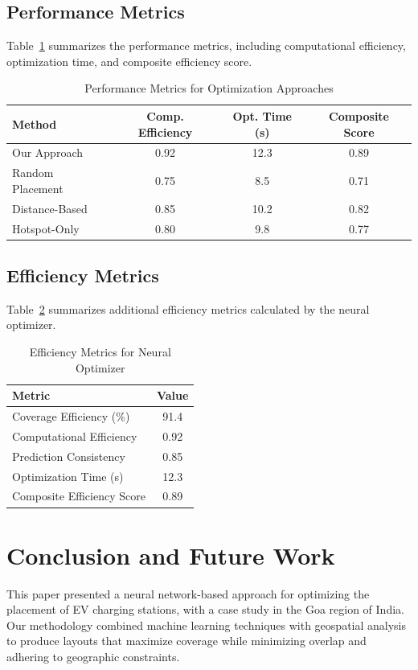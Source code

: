 \documentclass[journal]{IEEEtran}
\begin{document}
\subsection{Performance Metrics}
Table~\ref{tab:performance_metrics} summarizes the performance metrics, including computational efficiency, optimization time, and composite efficiency score.

\begin{table}[htbp]
\centering
\small
\caption{Performance Metrics for Optimization Approaches}
\label{tab:performance_metrics}
\setlength{\tabcolsep}{6pt}
\begin{tabular}{lccc}
\toprule
\textbf{Method} & \textbf{Comp. Efficiency} & \textbf{Opt. Time (s)} & \textbf{Composite Score} \\ 
\midrule
Our Approach      & 0.92 & 12.3 & 0.89 \\ 
Random Placement  & 0.75 & 8.5  & 0.71 \\ 
Distance-Based    & 0.85 & 10.2 & 0.82 \\ 
Hotspot-Only      & 0.80 & 9.8  & 0.77 \\ 
\bottomrule
\end{tabular}
\end{table}

\subsection{Efficiency Metrics}
Table~\ref{tab:efficiency_metrics} summarizes additional efficiency metrics calculated by the neural optimizer.

\begin{table}[htbp]
\centering
\small
\caption{Efficiency Metrics for Neural Optimizer}
\label{tab:efficiency_metrics}
\begin{tabular}{lc}
\toprule
\textbf{Metric} & \textbf{Value} \\ 
\midrule
Coverage Efficiency (\%)   & 91.4 \\ [2pt]
Computational Efficiency   & 0.92 \\ [2pt]
Prediction Consistency     & 0.85 \\ [2pt]
Optimization Time (s)      & 12.3 \\ [2pt]
Composite Efficiency Score & 0.89 \\ 
\bottomrule
\end{tabular}
\end{table}

\section{Conclusion and Future Work}
This paper presented a neural network-based approach for optimizing the placement of EV charging stations, with a case study in the Goa region of India. Our methodology combined machine learning techniques with geospatial analysis to produce layouts that maximize coverage while minimizing overlap and adhering to geographic constraints.
\end{document}
